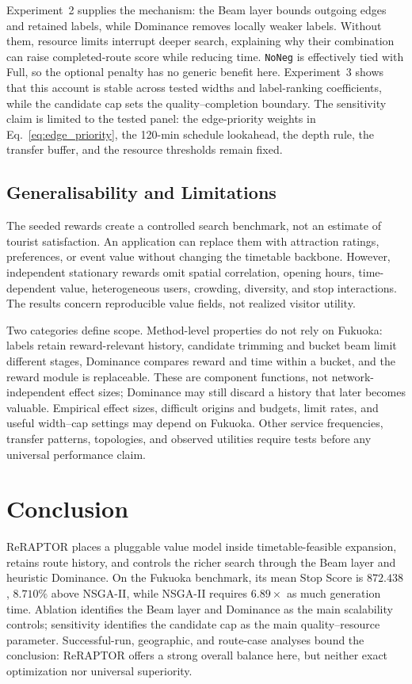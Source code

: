 Experiment~2 supplies the mechanism: the Beam layer bounds
outgoing edges and retained labels, while Dominance removes locally weaker
labels. Without them,
resource limits interrupt deeper search, explaining why their combination can
raise completed-route score while reducing time. \texttt{NoNeg} is effectively
tied with Full, so the optional penalty has no generic benefit here.
Experiment~3 shows that this account is stable across tested widths and
label-ranking coefficients, while the candidate cap sets the
quality--completion boundary. The sensitivity claim is limited to the tested
panel: the edge-priority weights in Eq.~\ref{eq:edge_priority}, the 120-min
schedule lookahead, the depth rule, the transfer buffer, and the resource
thresholds remain fixed.

\subsection{Generalisability and Limitations}
The seeded rewards create a controlled search benchmark, not an estimate of
tourist satisfaction. An application can replace them with attraction ratings,
preferences, or event value without changing the timetable backbone. However,
independent stationary rewards omit spatial correlation, opening hours,
time-dependent value, heterogeneous users, crowding, diversity, and stop
interactions. The results concern reproducible value fields, not realized
visitor utility.

Two categories define scope. Method-level properties do not rely
on Fukuoka: labels retain reward-relevant history, candidate trimming and bucket
beam limit different stages, Dominance compares reward and time within a bucket,
and the reward module is replaceable. These are component functions, not
network-independent effect sizes; Dominance may still discard a history that
later becomes valuable. Empirical effect sizes, difficult origins and budgets,
limit rates, and useful width--cap settings may depend on Fukuoka. Other service
frequencies, transfer patterns, topologies, and observed utilities require tests
before any universal performance claim.

\section{Conclusion}
ReRAPTOR places a pluggable value model inside timetable-feasible expansion,
retains route history, and controls the richer search through the Beam layer
and heuristic
Dominance. On the Fukuoka benchmark, its mean Stop Score is \(872.438\),
\(8.710\%\) above NSGA-II, while NSGA-II requires \(6.89\times\) as much
generation time. Ablation identifies
the Beam layer and Dominance as the main scalability controls; sensitivity
identifies the
candidate cap as the main quality--resource parameter. Successful-run,
geographic, and route-case analyses bound the conclusion: ReRAPTOR offers a
strong overall balance here, but neither exact optimization nor universal
superiority.

